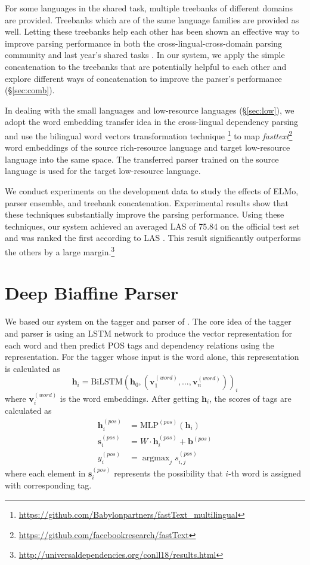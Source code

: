 \documentclass[11pt,a4paper]{article}
\DeclareMathOperator*{\argmax}{argmax}
\begin{document}
For some languages in the shared task, multiple treebanks of different domains are provided.
Treebanks which are of the same language families are provided as well.
Letting these treebanks help each other has been shown an effective way to improve parsing performance
in both the cross-lingual-cross-domain parsing community and last year's shared tasks \cite{TACL892,guo-EtAl:2015:ACL-IJCNLP2,che-EtAl:2017:K17-3,shi-EtAl:2017:K17-3,bjorkelund-EtAl:2017:K17-3}.
In our system, we apply the simple concatenation to the treebanks that are potentially
helpful to each other
and explore different ways of concatenation to improve the parser's performance (\S\ref{sec:comb}).

In dealing with the small languages and low-resource languages (\S\ref{sec:low}),
we adopt the word embedding transfer idea 
in the cross-lingual dependency parsing \cite{guo-EtAl:2015:ACL-IJCNLP2}
and use the bilingual word vectors transformation technique \cite{DBLP:journals/corr/SmithTHH17}\footnote{\url{https://github.com/Babylonpartners/fastText_multilingual}}
to map \textit{fasttext}\footnote{\url{https://github.com/facebookresearch/fastText}} word embeddings \cite{DBLP:journals/corr/BojanowskiGJM16}
of the source rich-resource language and target low-resource language
into the same space.
The transferred parser trained on the source language is used for the target low-resource language.

We conduct experiments on the development data to study
the effects of ELMo, parser ensemble, and treebank concatenation.
Experimental results show that these techniques substantially improve the parsing performance.
Using these techniques, our system achieved an averaged LAS of 75.84 on the official test set
and was ranked the first according to LAS \cite{udst:overview}.
This result significantly outperforms the others by a large margin.\footnote{\url{http://universaldependencies.org/conll18/results.html}}

\section{Deep Biaffine Parser}\label{sec:biaffine}

We based our system on the tagger and parser of \citet{dozat-qi-manning:2017:K17-3}.
The core idea of the tagger and parser
is using an LSTM network to produce the vector representation
for each word and then predict POS tags and dependency relations
using the representation.
For the tagger whose input is the word alone,
this representation is calculated as
\[
\mathbf{h}_i =  \text{BiLSTM}(\mathbf{h}_0, (\mathbf{v}_1^{(word)}, ..., \mathbf{v}_n^{(word)}))_i
\]
where $\mathbf{v}_i^{(word)}$ is the word embeddings.
After getting $\mathbf{h}_i$,
the scores of tags are calculated as
\begin{align*}
\mathbf{h}_i^{(pos)} & = \text{MLP}^{(pos)} (\mathbf{h}_i) \\
\mathbf{s}_i^{(pos)} & = W \cdot \mathbf{h}_i^{(pos)} + \mathbf{b}^{(pos)} \\
y_i^{(pos)} & = \argmax_{j} s_{i, j}^{(pos)} 
\end{align*}
where each element in $\mathbf{s}_i^{(pos)}$ represents the possibility
that $i$-th word is assigned with corresponding tag.
\end{document}
